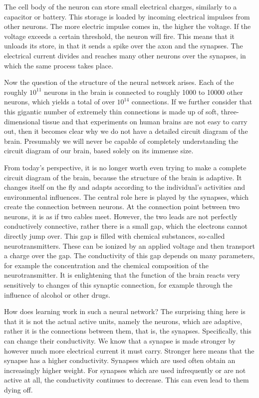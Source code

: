 \documentclass[10pt]{book}
\begin{document}
The cell body of the neuron can store small electrical charges, similarly to a capacitor or battery. This storage is loaded by incoming electrical impulses from other neurons. The more electric impulse comes in, the higher the voltage. If the voltage exceeds a certain threshold, the neuron will fire. This means that it unloads its store, in that it sends a spike over the axon and the synapses. The electrical current divides and reaches many other neurons over the synapses, in which the same process takes place.

Now the question of the structure of the neural network arises. Each of the roughly $10^{11}$ neurons in the brain is connected to roughly 1000 to 10000 other neurons, which yields a total of over $10^{14}$ connections. If we further consider that this gigantic number of extremely thin connections is made up of soft, three-dimensional tissue and that experiments on human brains are not easy to carry out, then it becomes clear why we do not have a detailed circuit diagram of the brain. Presumably we will never be capable of completely understanding the circuit diagram of our brain, based solely on its immense size.

From today's perspective, it is no longer worth even trying to make a complete circuit diagram of the brain, because the structure of the brain is adaptive. It changes itself on the fly and adapts according to the individual's activities and environmental influences. The central role here is played by the synapses, which create the connection between neurons. At the connection point between two neurons, it is as if two cables meet. However, the two leads are not perfectly conductively connective, rather there is a small gap, which the electrons cannot directly jump over. This gap is filled with chemical substances, so-called neurotransmitters. These can be ionized by an applied voltage and then transport a charge over the gap. The conductivity of this gap depends on many parameters, for example the concentration and the chemical composition of the neurotransmitter. It is enlightening that the function of the brain reacts very sensitively to changes of this synaptic connection, for example through the influence of alcohol or other drugs.

How does learning work in such a neural network? The surprising thing here is that it is not the actual active units, namely the neurons, which are adaptive, rather it is the connections between them, that is, the synapses. Specifically, this can change their conductivity. We know that a synapse is made stronger by however much more electrical current it must carry. Stronger here means that the synapse has a higher conductivity. Synapses which are used often obtain an increasingly higher weight. For synapses which are used infrequently or are not active at all, the conductivity continues to decrease. This can even lead to them dying off.
\end{document}
